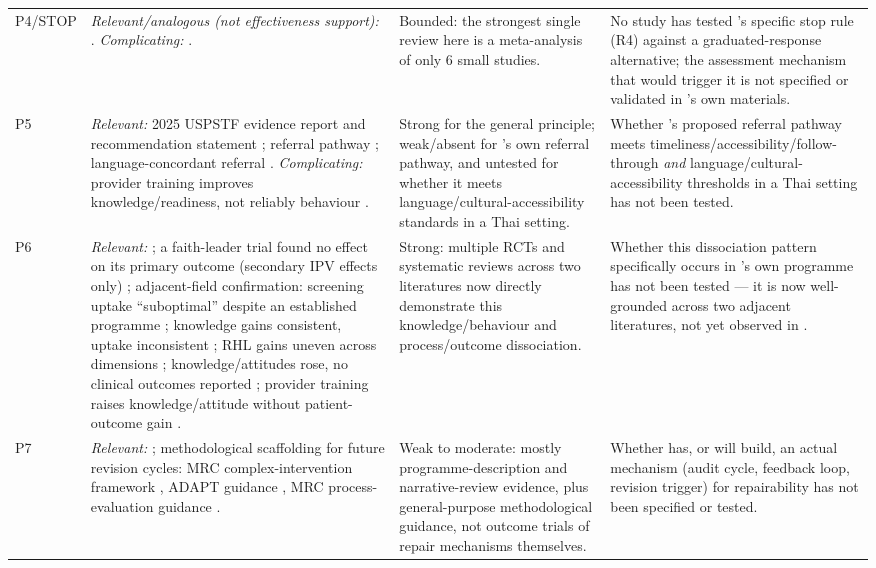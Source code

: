 \begin{table}[t]
\begin{tabularx}{\textwidth}{@{}p{0.9cm}YYY@{}}
\addlinespace
P4\slash STOP & \emph{Relevant/analogous (not effectiveness support):} \cite{ref45,ref46,ref47,ref48,ref9,ref10,ref43}. \emph{Complicating:} \cite{ref49,ref50}. & Bounded: the strongest single review here is a meta-analysis of only 6 small studies. & No study has tested \tphe{}'s specific stop rule (R4) against a graduated-response alternative; the assessment mechanism that would trigger it is not specified or validated in \tphe{}'s own materials.\\
\addlinespace
P5 & \emph{Relevant:} 2025 USPSTF evidence report and recommendation statement \cite{ref38,ref39,ref40}; referral pathway \cite{ref42,ref43,ref44,ref104,ref105,ref106,ref107}; language-concordant referral \cite{ref60,ref62,ref63,ref61,ref64}. \emph{Complicating:} provider training improves knowledge/readiness, not reliably behaviour \cite{ref108,ref109,ref41}. & Strong for the general principle; weak/absent for \tphe{}'s own referral pathway, and untested for whether it meets language/cultural-accessibility standards in a Thai setting. & Whether \tphe{}'s proposed referral pathway meets timeliness/accessibility/follow-through \emph{and} language/cultural-accessibility thresholds in a Thai setting has not been tested.\\
\addlinespace
P6 & \emph{Relevant:} \cite{ref110,ref28,ref111,ref112}; a faith-leader trial found no effect on its primary outcome (secondary IPV effects only) \cite{ref29}; adjacent-field confirmation: screening uptake ``suboptimal'' despite an established programme \cite{ref12}; knowledge gains consistent, uptake inconsistent \cite{ref13}; RHL gains uneven across dimensions \cite{ref34}; knowledge/attitudes rose, no clinical outcomes reported \cite{ref35}; provider training raises knowledge/attitude without patient-outcome gain \cite{ref55,ref56,ref57}. & Strong: multiple RCTs and systematic reviews across two literatures now directly demonstrate this knowledge/behaviour and process/outcome dissociation. & Whether this dissociation pattern specifically occurs in \tphe{}'s own programme has not been tested --- it is now well-grounded across two adjacent literatures, not yet observed in \tphe{}.\\
\addlinespace
P7 & \emph{Relevant:} \cite{ref113,ref114,ref31,ref115,ref116}; methodological scaffolding for future revision cycles: MRC complex-intervention framework \cite{ref52}, ADAPT guidance \cite{ref53}, MRC process-evaluation guidance \cite{ref54}. & Weak to moderate: mostly programme-description and narrative-review evidence, plus general-purpose methodological guidance, not outcome trials of repair mechanisms themselves. & Whether \tphe{} has, or will build, an actual mechanism (audit cycle, feedback loop, revision trigger) for repairability has not been specified or tested.\\
\bottomrule
\end{tabularx}
\end{table}

